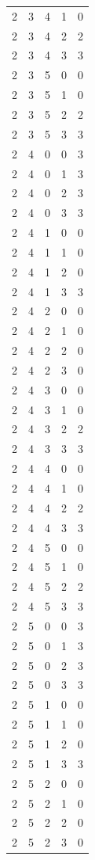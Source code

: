 \begin{longtable}{rrrrr}
2 & 3 & 4 & 1 & 0 \\
2 & 3 & 4 & 2 & 2 \\
2 & 3 & 4 & 3 & 3 \\
2 & 3 & 5 & 0 & 0 \\
2 & 3 & 5 & 1 & 0 \\
2 & 3 & 5 & 2 & 2 \\
2 & 3 & 5 & 3 & 3 \\
2 & 4 & 0 & 0 & 3 \\
2 & 4 & 0 & 1 & 3 \\
2 & 4 & 0 & 2 & 3 \\
2 & 4 & 0 & 3 & 3 \\
2 & 4 & 1 & 0 & 0 \\
2 & 4 & 1 & 1 & 0 \\
2 & 4 & 1 & 2 & 0 \\
2 & 4 & 1 & 3 & 3 \\
2 & 4 & 2 & 0 & 0 \\
2 & 4 & 2 & 1 & 0 \\
2 & 4 & 2 & 2 & 0 \\
2 & 4 & 2 & 3 & 0 \\
2 & 4 & 3 & 0 & 0 \\
2 & 4 & 3 & 1 & 0 \\
2 & 4 & 3 & 2 & 2 \\
2 & 4 & 3 & 3 & 3 \\
2 & 4 & 4 & 0 & 0 \\
2 & 4 & 4 & 1 & 0 \\
2 & 4 & 4 & 2 & 2 \\
2 & 4 & 4 & 3 & 3 \\
2 & 4 & 5 & 0 & 0 \\
2 & 4 & 5 & 1 & 0 \\
2 & 4 & 5 & 2 & 2 \\
2 & 4 & 5 & 3 & 3 \\
2 & 5 & 0 & 0 & 3 \\
2 & 5 & 0 & 1 & 3 \\
2 & 5 & 0 & 2 & 3 \\
2 & 5 & 0 & 3 & 3 \\
2 & 5 & 1 & 0 & 0 \\
2 & 5 & 1 & 1 & 0 \\
2 & 5 & 1 & 2 & 0 \\
2 & 5 & 1 & 3 & 3 \\
2 & 5 & 2 & 0 & 0 \\
2 & 5 & 2 & 1 & 0 \\
2 & 5 & 2 & 2 & 0 \\
2 & 5 & 2 & 3 & 0 \\

\end{longtable}
